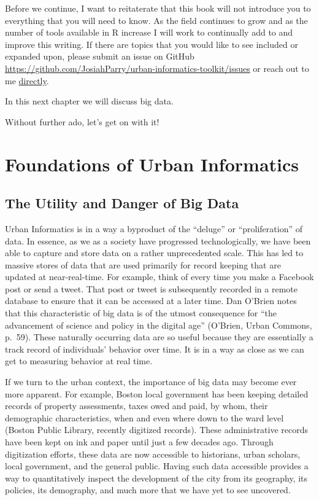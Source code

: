 \documentclass[
]{book}
\begin{document}
Before we continue, I want to reitaterate that this book will not introduce you to everything that you will need to know. As the field continues to grow and as the number of tools available in R increase I will work to continually add to and improve this writing. If there are topics that you would like to see included or expanded upon, please submit an issue on GitHub \url{https://github.com/JosiahParry/urban-informatics-toolkit/issues} or reach out to me \href{mailto:josiah.parry@gmail.com?subject=\%5BUITK\%5D\%20Feedback}{directly}.

In this next chapter we will discuss big data.

Without further ado, let's get on with it!

\hypertarget{part-foundations-of-urban-informatics}{%
\part{Foundations of Urban Informatics}\label{part-foundations-of-urban-informatics}}

\hypertarget{the-utility-and-danger-of-big-data}{%
\chapter{The Utility and Danger of Big Data}\label{the-utility-and-danger-of-big-data}}

Urban Informatics is in a way a byproduct of the ``deluge'' or ``proliferation'' of data. In essence, as we as a society have progressed technologically, we have been able to capture and store data on a rather unprecedented scale. This has led to massive stores of data that are used primarily for record keeping that are updated at near-real-time. For example, think of every time you make a Facebook post or send a tweet. That post or tweet is subsequently recorded in a remote database to ensure that it can be accessed at a later time. Dan O'Brien notes that this characteristic of big data is of the utmost consequence for ``the advancement of science and policy in the digital age'' (O'Brien, Urban Commons, p.~59). These naturally occurring data are so useful because they are essentially a track record of individuals' behavior over time. It is in a way as close as we can get to measuring behavior at real time.

If we turn to the urban context, the importance of big data may become ever more apparent. For example, Boston local government has been keeping detailed records of property assessments, taxes owed and paid, by whom, their demographic characteristics, when and even where down to the ward level (Boston Public Library, recently digitized records). These administrative records have been kept on ink and paper until just a few decades ago. Through digitization efforts, these data are now accessible to historians, urban scholars, local government, and the general public. Having such data accessible provides a way to quantitatively inspect the development of the city from its geography, its policies, its demography, and much more that we have yet to see uncovered.
\end{document}
